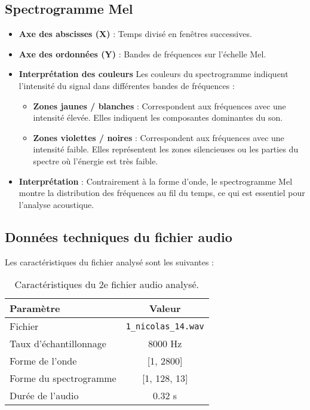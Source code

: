 \documentclass[11pt,a4paper]{article}
\begin{document}
\subsection{Spectrogramme Mel}
\begin{itemize}
    \item \textbf{Axe des abscisses (X)} : Temps divisé en fenêtres successives.
    \item \textbf{Axe des ordonnées (Y)} : Bandes de fréquences sur l’échelle Mel.
    \item \textbf{Interprétation des couleurs}
    Les couleurs du spectrogramme indiquent l'intensité du signal dans différentes bandes de fréquences :
    \begin{itemize}
        \item \textbf{Zones jaunes / blanches} : Correspondent aux fréquences avec une intensité élevée. Elles indiquent les composantes dominantes du son.
        \item \textbf{Zones violettes / noires} : Correspondent aux fréquences avec une intensité faible. Elles représentent les zones silencieuses ou les parties du spectre où l’énergie est très faible.
    \end{itemize}
    \item \textbf{Interprétation} : Contrairement à la forme d’onde, le spectrogramme Mel montre la distribution des fréquences au fil du temps, ce qui est essentiel pour l’analyse acoustique.
\end{itemize}

\subsection{Données techniques du fichier audio}
Les caractéristiques du fichier analysé sont les suivantes :

\begin{table}[h]
    \centering
    \begin{tabular}{|l|c|}
        \hline
        \textbf{Paramètre} & \textbf{Valeur} \\
        \hline
        Fichier & \texttt{1\_nicolas\_14.wav} \\
        Taux d’échantillonnage & 8000 Hz \\
        Forme de l’onde & [1, 2800] \\
        Forme du spectrogramme & [1, 128, 13] \\
        Durée de l’audio & 0.32 s \\
        \hline
    \end{tabular}
    \caption{Caractéristiques du 2e fichier audio analysé.}
    \label{tab:audio_info}
\end{table}
\end{document}
